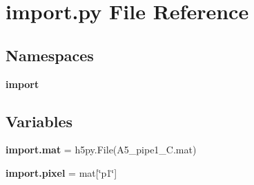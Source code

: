 \section{import.\+py File Reference}
\label{import_8py}
\subsection*{Namespaces}
\begin{DoxyCompactItemize}
\item 
 \textbf{ import}
\end{DoxyCompactItemize}
\subsection*{Variables}
\begin{DoxyCompactItemize}
\item 
\textbf{ import.\+mat} = h5py.\+File(\textquotesingle{}A5\+\_\+pipe1\+\_\+C.\+mat\textquotesingle{})
\item 
\textbf{ import.\+pixel} = mat[\char`\"{}p1\char`\"{}]
\end{DoxyCompactItemize}
